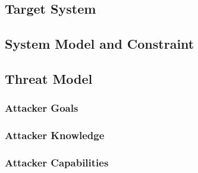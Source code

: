\placeholder

\subsection{Target System}
\placeholder

\subsection{System Model and Constraint}
\placeholder

\subsection{Threat Model}
\placeholder

\subsubsection{Attacker Goals}
\placeholder

\subsubsection{Attacker Knowledge}
\placeholder

\subsubsection{Attacker Capabilities}
\placeholder